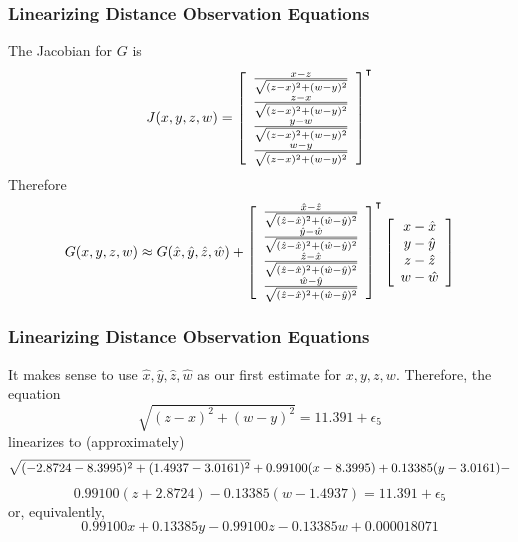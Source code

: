 \documentclass[xcolor=dvipsnames]{beamer}
\begin{document}
\begin{frame}
  \frametitle{Linearizing Distance Observation Equations}
  The Jacobian for $G$ is
  \begin{equation}
    \label{eq:ahchaiyi}
    J(x,y,z,w)=\left[
      \begin{array}{c}
     \frac{x-z}{\sqrt{(z-x)^{2}+(w-y)^{2}}} \\
     \frac{z-x}{\sqrt{(z-x)^{2}+(w-y)^{2}}} \\
     \frac{y-w}{\sqrt{(z-x)^{2}+(w-y)^{2}}} \\
     \frac{w-y}{\sqrt{(z-x)^{2}+(w-y)^{2}}}
      \end{array}\right]^{\intercal}\notag
  \end{equation}
  Therefore
  \begin{equation}
    \label{eq:ziexowei}
    G(x,y,z,w)\approx{}G(\hat{x},\hat{y},\hat{z},\hat{w})+\left[
      \begin{array}{c}
     \frac{\hat{x}-\hat{z}}{\sqrt{(\hat{z}-\hat{x})^{2}+(\hat{w}-\hat{y})^{2}}} \\
     \frac{\hat{y}-\hat{w}}{\sqrt{(\hat{z}-\hat{x})^{2}+(\hat{w}-\hat{y})^{2}}} \\
     \frac{\hat{z}-\hat{x}}{\sqrt{(\hat{z}-\hat{x})^{2}+(\hat{w}-\hat{y})^{2}}} \\
     \frac{\hat{w}-\hat{y}}{\sqrt{(\hat{z}-\hat{x})^{2}+(\hat{w}-\hat{y})^{2}}}
      \end{array}\right]^{\intercal}\left[
      \begin{array}{c}
        x-\hat{x} \\
        y-\hat{y} \\
        z-\hat{z} \\
        w-\hat{w}
      \end{array}\right]\notag
  \end{equation}
\end{frame}

\begin{frame}
  \frametitle{Linearizing Distance Observation Equations}
  It makes sense to use $\hat{x},\hat{y},\hat{z},\hat{w}$ as our first
  estimate for $x,y,z,w$. Therefore, the equation
  \begin{equation}
    \label{eq:jahxiebo}
      \sqrt{(z-x)^{2}+(w-y)^{2}}=11.391+\epsilon_{5}
  \end{equation}
  linearizes to (approximately)
  \begin{equation}
    \label{eq:dooxahru}
    \sqrt{(-2.8724-8.3995)^{2}+(1.4937-3.0161)^{2}}+0.99100(x-8.3995)+0.13385(y-3.0161)-\notag
  \end{equation}
  \begin{equation}
    \label{eq:yahziech}
    0.99100(z+2.8724)-0.13385(w-1.4937)=11.391+\epsilon_{5}
  \end{equation}
  or, equivalently,
  \begin{equation}
    \label{eq:axeeteja}
    0.99100x+0.13385y-0.99100z-0.13385w+0.000018071
  \end{equation}
\end{frame}
\end{document}
